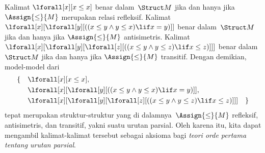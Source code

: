 \documentclass[../../../include/open-logic-section]{subfiles}
\begin{document}
\begin{ex}
Kalimat $\lforall[x][x \le x]$ benar dalam~$\Struct M$ jika dan hanya jika
$\Assign{\le}{M}$ merupakan relasi refleksif. Kalimat
$\lforall[x][\lforall[y][((x \le y \land y \le x) \lif x = y)]]$ benar
dalam~$\Struct M$ jika dan hanya jika $\Assign{\le}{M}$ antisimetris.
Kalimat $\lforall[x][\lforall[y][\lforall[z][((x \le y \land y \le z)
      \lif x \le z)]]]$ benar dalam~$\Struct M$ jika dan hanya jika
$\Assign{\le}{M}$ transitif. Dengan demikian, model-model dari
\begin{align*}
\{\quad &\lforall[x][x \le x], \\
   & \lforall[x][\lforall[y][((x \le y \land y \le
    x) \lif x = y)]], \\
   &\lforall[x][\lforall[y][\lforall[z][((x \le y
      \land y \le z) \lif x \le z)]]] \quad \}
\end{align*}
tepat merupakan struktur-struktur yang di dalamnya~$\Assign{\le}{M}$
refleksif, antisimetris, dan transitif, yakni suatu urutan parsial. Oleh karena
itu, kita dapat mengambil kalimat-kalimat tersebut sebagai aksioma bagi
\emph{teori orde pertama tentang urutan parsial}.
\end{ex}
\end{document}
